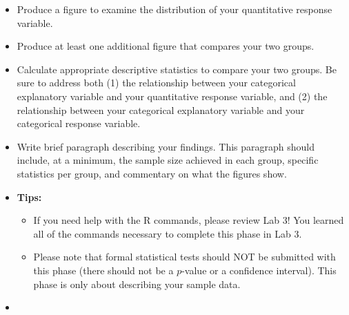 \documentclass[letterpaper,12pt]{report}
\begin{document}
\clearpage
{}
\begin{itemize}
    \item Produce a figure to examine the distribution of your quantitative response variable.
    \item Produce at least one additional figure that compares your two groups.
    \item Calculate appropriate descriptive statistics to compare your two groups.  Be sure to address both (1) the relationship between your categorical explanatory variable and your quantitative response variable, and (2) the relationship between your categorical explanatory variable and your categorical response variable.
    \item Write brief paragraph describing your findings.  This paragraph should include, at a minimum, the sample size achieved in each group, specific statistics per group, and commentary on what the figures show.
     \item \textbf{Tips:}
    \begin{itemize}
    \item If you need help with the R commands, please review Lab 3!  You learned all of the commands necessary to complete this phase in Lab 3.
    \item Please note that formal statistical tests should NOT be submitted with this phase (there should not be a $p$-value or a confidence interval).  This phase is only about describing your sample data.
    \end{itemize}
    \item[]
\end{itemize}
\end{document}
